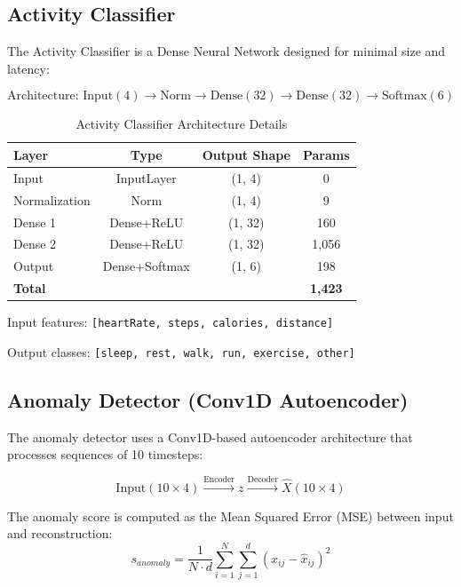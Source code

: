 \documentclass[conference]{IEEEtran}
\begin{document}
\subsection{Activity Classifier}
The Activity Classifier is a Dense Neural Network designed for minimal size and latency:

\begin{equation}
\text{Architecture: } \text{Input}(4) \rightarrow \text{Norm} \rightarrow \text{Dense}(32) \rightarrow \text{Dense}(32) \rightarrow \text{Softmax}(6)
\end{equation}

\begin{table}[H]
\centering
\caption{Activity Classifier Architecture Details}
\label{tab:activity_arch}
\begin{tabular}{lccc}
\toprule
\textbf{Layer} & \textbf{Type} & \textbf{Output Shape} & \textbf{Params} \\
\midrule
Input & InputLayer & (1, 4) & 0 \\
Normalization & Norm & (1, 4) & 9 \\
Dense 1 & Dense+ReLU & (1, 32) & 160 \\
Dense 2 & Dense+ReLU & (1, 32) & 1,056 \\
Output & Dense+Softmax & (1, 6) & 198 \\
\midrule
\textbf{Total} & & & \textbf{1,423} \\
\bottomrule
\end{tabular}
\end{table}

Input features: \texttt{[heartRate, steps, calories, distance]}

Output classes: \texttt{[sleep, rest, walk, run, exercise, other]}

\subsection{Anomaly Detector (Conv1D Autoencoder)}
The anomaly detector uses a Conv1D-based autoencoder architecture that processes sequences of 10 timesteps:

\begin{equation}
\text{Input}(10 \times 4) \xrightarrow{\text{Encoder}} z \xrightarrow{\text{Decoder}} \hat{X}(10 \times 4)
\end{equation}

The anomaly score is computed as the Mean Squared Error (MSE) between input and reconstruction:
\begin{equation}
s_{anomaly} = \frac{1}{N \cdot d} \sum_{i=1}^{N} \sum_{j=1}^{d} (x_{ij} - \hat{x}_{ij})^2
\end{equation}
\end{document}
